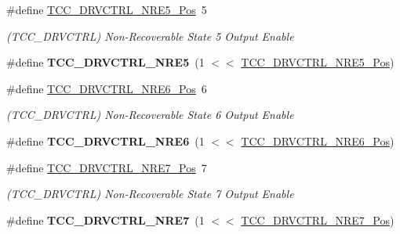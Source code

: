 \begin{DoxyCompactItemize}
\item 
\hypertarget{group___s_a_m_l21___t_c_c_gaa45cc8949d437ea55feab8bf6b962a6c}{}\#define \hyperlink{group___s_a_m_l21___t_c_c_gaa45cc8949d437ea55feab8bf6b962a6c}{T\+C\+C\+\_\+\+D\+R\+V\+C\+T\+R\+L\+\_\+\+N\+R\+E5\+\_\+\+Pos}~5\label{group___s_a_m_l21___t_c_c_gaa45cc8949d437ea55feab8bf6b962a6c}

\begin{DoxyCompactList}\small\item\em (T\+C\+C\+\_\+\+D\+R\+V\+C\+T\+R\+L) Non-\/\+Recoverable State 5 Output Enable \end{DoxyCompactList}\item 
\hypertarget{group___s_a_m_l21___t_c_c_gabef8dd3f75781d13d0125aa270b4f12b}{}\#define {\bfseries T\+C\+C\+\_\+\+D\+R\+V\+C\+T\+R\+L\+\_\+\+N\+R\+E5}~(1 $<$$<$ \hyperlink{group___s_a_m_l21___t_c_c_gaa45cc8949d437ea55feab8bf6b962a6c}{T\+C\+C\+\_\+\+D\+R\+V\+C\+T\+R\+L\+\_\+\+N\+R\+E5\+\_\+\+Pos})\label{group___s_a_m_l21___t_c_c_gabef8dd3f75781d13d0125aa270b4f12b}

\item 
\hypertarget{group___s_a_m_l21___t_c_c_ga443bd29f4e34927b351cf8c55b24fba1}{}\#define \hyperlink{group___s_a_m_l21___t_c_c_ga443bd29f4e34927b351cf8c55b24fba1}{T\+C\+C\+\_\+\+D\+R\+V\+C\+T\+R\+L\+\_\+\+N\+R\+E6\+\_\+\+Pos}~6\label{group___s_a_m_l21___t_c_c_ga443bd29f4e34927b351cf8c55b24fba1}

\begin{DoxyCompactList}\small\item\em (T\+C\+C\+\_\+\+D\+R\+V\+C\+T\+R\+L) Non-\/\+Recoverable State 6 Output Enable \end{DoxyCompactList}\item 
\hypertarget{group___s_a_m_l21___t_c_c_gad265d1f789a0e1047f7947f64cc23093}{}\#define {\bfseries T\+C\+C\+\_\+\+D\+R\+V\+C\+T\+R\+L\+\_\+\+N\+R\+E6}~(1 $<$$<$ \hyperlink{group___s_a_m_l21___t_c_c_ga443bd29f4e34927b351cf8c55b24fba1}{T\+C\+C\+\_\+\+D\+R\+V\+C\+T\+R\+L\+\_\+\+N\+R\+E6\+\_\+\+Pos})\label{group___s_a_m_l21___t_c_c_gad265d1f789a0e1047f7947f64cc23093}

\item 
\hypertarget{group___s_a_m_l21___t_c_c_gae84afa857a57c7c8a218344f60320fb4}{}\#define \hyperlink{group___s_a_m_l21___t_c_c_gae84afa857a57c7c8a218344f60320fb4}{T\+C\+C\+\_\+\+D\+R\+V\+C\+T\+R\+L\+\_\+\+N\+R\+E7\+\_\+\+Pos}~7\label{group___s_a_m_l21___t_c_c_gae84afa857a57c7c8a218344f60320fb4}

\begin{DoxyCompactList}\small\item\em (T\+C\+C\+\_\+\+D\+R\+V\+C\+T\+R\+L) Non-\/\+Recoverable State 7 Output Enable \end{DoxyCompactList}\item 
\hypertarget{group___s_a_m_l21___t_c_c_gad27202c5b82c8ecc2226c10fa7edc14b}{}\#define {\bfseries T\+C\+C\+\_\+\+D\+R\+V\+C\+T\+R\+L\+\_\+\+N\+R\+E7}~(1 $<$$<$ \hyperlink{group___s_a_m_l21___t_c_c_gae84afa857a57c7c8a218344f60320fb4}{T\+C\+C\+\_\+\+D\+R\+V\+C\+T\+R\+L\+\_\+\+N\+R\+E7\+\_\+\+Pos})\label{group___s_a_m_l21___t_c_c_gad27202c5b82c8ecc2226c10fa7edc14b}


\end{DoxyCompactItemize}
